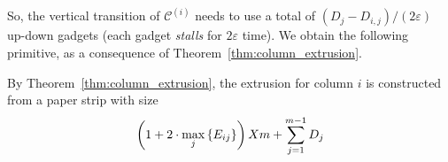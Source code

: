 So, the vertical transition of $\mathcal C^{(i)}$ needs to use a total of $\left( D_j - D_{i,j}\right)/\left( 2\varepsilon\right)$
up-down gadgets (each gadget \emph{stalls} for $2\varepsilon$ time).
We obtain the following primitive, as a consequence of Theorem~\ref{thm:column_extrusion}.

\begin{proposition}
\label{prop:accordion_layers}
By Theorem~\ref{thm:column_extrusion}, the extrusion for column $i$ is constructed from a paper strip with size
$$\left( 1 + 2\cdot\max_j\left\{ E_{ij}\right\}\right) {\sc X}  m + \sum\limits^{m-1}_{j=1} D_j $$
\end{proposition}
